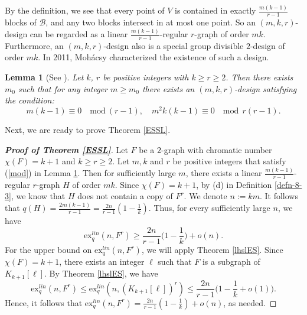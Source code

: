 \documentclass[11pt,a4paper]{article}
\theoremstyle{plain}
\newtheorem{lem}[theorem]{Lemma}
\theoremstyle{definition}
\begin{document}
By the definition, we see that every point of $V$ is contained in exactly $\frac{m(k-1)}{r-1}$ blocks of $\mathcal{B}$, and any two blocks intersect in at most one point. 
So an $(m,k,r)$-design can be regarded as a linear $\frac{m(k-1)}{r-1}$-regular $r$-graph of order $mk$. Furthermore, an $(m,k,r)$-design also is a special group divisible $2$-design of order $mk$. In 2011, Moh\'acsy \cite{Moh2011} characterized the existence of such a design.

\begin{lem}[See \cite{Moh2011}]\label{design}
Let $k$, $r$ be positive integers with $k\geq r\geq2$. Then there exists $m_{0}$ such that for any integer $m\geq m_{0}$ there exists an
$(m,k,r)$-design satisfying the condition:
\begin{equation}\label{mod}
 m(k-1) \equiv 0 \hspace{1em} \mathrm{mod}~(r-1), \quad 
 m^{2}k(k-1) \equiv 0 \hspace{1em} \mathrm{mod}~~r(r-1).
 \end{equation}
\end{lem}

Next, we are ready to prove Theorem \ref{ESSL}. 

\begin{proof}[{\bf Proof of Theorem \ref{ESSL}}] 
Let $F$ be a $2$-graph with chromatic number $\chi(F) =k+1$ and $k\ge r\ge 2$.  
 Let $m,k$ and $r$ be positive integers that satisfy (\ref{mod}) in Lemma \ref{design}.  Then for sufficiently large $m$,  there exists a linear $\frac{m(k-1)}{r-1}$-regular $r$-graph $H$ of order $mk$. 
 Since $\chi (F)=k+1$, by (d) in Definition \ref{defn-8-3}, 
 we know that $H$ does not contain a copy of $F^r$.   
 We denote $n :=km$. 
 It follows that $q(H)=\frac{2m(k-1)}{r-1}=\frac{2n}{r-1}(1-\frac{1}{k})$. Thus, for every sufficiently large $n$, we have 
\begin{equation*}
\mathrm{ex}_{q}^{lin}(n,F^{r}) \geq \frac{2n}{r-1}\bigg(1-\frac{1}{k}\bigg) + o(n).
\end{equation*} 
For the upper bound on $\mathrm{ex}_{q}^{lin}(n,F^{r})$, 
we will apply Theorem \ref{lhslES}. 
Since $\chi(F)=k+1$, there exists an integer $\ell$ such that $F$ is a subgraph of $K_{k+1}[\ell]$. 
By Theorem \ref{lhslES},
we have
$$\mathrm{ex}_{q}^{lin}(n,F^{r})\leq \mathrm{ex}_{q}^{lin}(n,(K_{k+1}[\ell])^{r})\leq \frac{2n}{r-1}\bigg(1-\frac{1}{k}+o(1)\bigg).$$
Hence, it follows that $\mathrm{ex}_{q}^{lin}(n,F^{r}) =  \frac{2n}{r-1}(1- \frac{1}{k})+ o(n)$, as needed.  
\end{proof}
\end{document}
